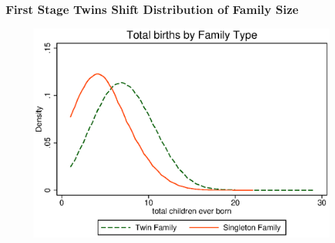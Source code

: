 \documentclass[9pt,letterpaper,subeqn]{beamer}
\begin{document}
\begin{frame}[label=FS1]
\frametitle{First Stage Twins Shift Distribution of Family Size}
\begin{figure}[htpb!]
\centering
  \includegraphics[scale=0.75]{./figures/famsize.eps}
\end{figure}
\hyperlink{Fstage}{}
\end{frame}



\begin{frame}[label=IV]

\hyperlink{Fstage2}{}
\end{frame}




\begin{frame}[label=USAIV]

\end{frame}


\end{document}
